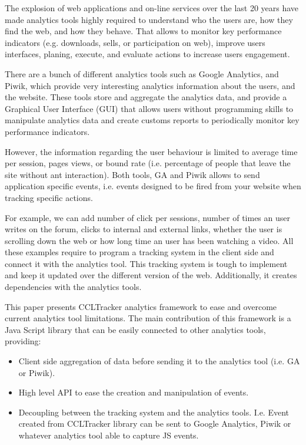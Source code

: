 \documentclass{article}
\begin{document}
The explosion of web applications and on-line services over the last 20 years have made analytics tools highly required to understand who the users are, how they find the web, and how they behave. That allows to monitor key performance indicators (e.g. downloads, sells, or participation on web), improve users interfaces, planing, execute, and evaluate actions to increase users engagement. 

There are a bunch of different analytics tools such as Google Analytics, and Piwik, which provide very interesting analytics information about the users, and the website. These tools store and aggregate the analytics data, and provide a Graphical User Interface (GUI) that allows users without programming skills to manipulate analytics data and create customs reports to periodically monitor key performance indicators.  

However, the information regarding the user behaviour is limited to average time per session, pages views, or bound rate (i.e. percentage of people that leave the site without ant interaction). Both tools, GA and Piwik allows to send application specific events, i.e. events designed to be fired from your website when tracking specific actions. 

 For example, we can add number of click per sessions, number of times an user writes on the forum, clicks to internal and external links, whether the user is scrolling down the web or how long time an user has been watching a video. All these examples require to program a tracking system in the client side and connect it with the analytics tool. This tracking system is tough to implement and keep it updated over the different version of the web. Additionally, it creates dependencies with the analytics tools.


This paper presents CCLTracker analytics framework to ease and overcome current analytics tool limitations. The main contribution of this framework is a Java Script library that can be easily connected to other analytics tools, providing:

\begin{itemize}
\item Client side aggregation of data before sending it to the analytics tool (i.e. GA or Piwik). 
\item High level API to ease the creation and manipulation of events. 
\item Decoupling between the tracking system and the analytics tools. I.e. Event created from CCLTracker library can be sent to Google Analytics, Piwik or whatever analytics tool able to capture JS events. 
\end{itemize}
\end{document}
